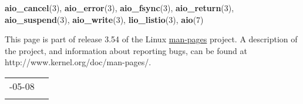 \documentclass[]{article}
\let\realtextbf=\textbf
\renewcommand{\textbf}[1]{\textcolor{boldcolor}{\realtextbf{#1}}}
\renewcommand{\emph}[1]{\underline{#1}}
\begin{document}
\textbf{aio\_cancel}(3), \textbf{aio\_error}(3), \textbf{aio\_fsync}(3),
\textbf{aio\_return}(3), \textbf{aio\_suspend}(3),
\textbf{aio\_write}(3), \textbf{lio\_listio}(3), \textbf{aio}(7)


This page is part of release 3.54 of the Linux \emph{man-pages} project.
A description of the project, and information about reporting bugs, can
be found at http://www.kernel.org/doc/man-pages/.

\begin{longtable}[c]{@{}ll@{}}
\toprule\addlinespace
2012-05-08 &
\\\addlinespace
\bottomrule
\end{longtable}
\end{document}
